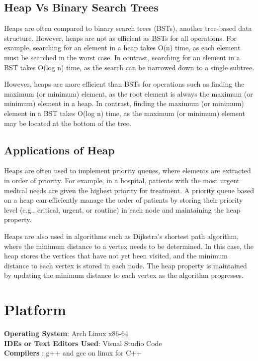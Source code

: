 \documentclass[11pt]{article}
\begin{document}
\subsection{Heap Vs Binary Search Trees}

Heaps are often compared to binary search trees (BSTs), another tree-based data structure. However, heaps are not as efficient as BSTs for all operations. For example, searching for an element in a heap takes O(n) time, as each element must be searched in the worst case. In contrast, searching for an element in a BST takes O(log n) time, as the search can be narrowed down to a single subtree.

However, heaps are more efficient than BSTs for operations such as finding the maximum (or minimum) element, as the root element is always the maximum (or minimum) element in a heap. In contrast, finding the maximum (or minimum) element in a BST takes O(log n) time, as the maximum (or minimum) element may be located at the bottom of the tree.

\subsection{Applications of Heap}

Heaps are often used to implement priority queues, where elements are extracted in order of priority. For example, in a hospital, patients with the most urgent medical needs are given the highest priority for treatment. A priority queue based on a heap can efficiently manage the order of patients by storing their priority level (e.g., critical, urgent, or routine) in each node and maintaining the heap property.

Heaps are also used in algorithms such as Dijkstra's shortest path algorithm, where the minimum distance to a vertex needs to be determined. In this case, the heap stores the vertices that have not yet been visited, and the minimum distance to each vertex is stored in each node. The heap property is maintained by updating the minimum distance to each vertex as the algorithm progresses.


\section{Platform}
\textbf{\textbf{Operating System}}: Arch Linux x86-64 \\
\textbf{\textbf{IDEs or Text Editors Used}}: Visual Studio Code\\
\textbf{\textbf{Compilers} }: g++ and gcc on linux for C++\\
\end{document}
